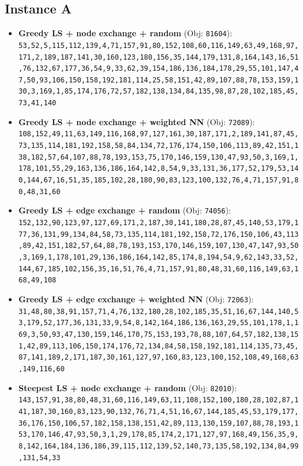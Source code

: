 \subsection{Instance A}
\begin{itemize}[leftmargin=1.5em]
    \item \textbf{Greedy LS + node exchange + random} (Obj: \texttt{81604}):\\
    \texttt{53,52,5,115,112,139,4,71,157,91,80,152,108,60,116,149,63,49,168,97,171,2,189,187,141,30,160,123,180,156,35,144,179,131,8,164,143,16,51,76,132,67,177,36,54,9,33,62,39,154,186,136,184,178,29,55,101,147,47,50,93,106,150,158,192,181,114,25,58,151,42,89,107,88,78,153,159,130,3,169,1,85,174,176,72,57,182,138,134,84,135,98,87,28,102,185,45,73,41,140}
    \item \textbf{Greedy LS + node exchange + weighted NN} (Obj: \texttt{72089}):\\
    \texttt{108,152,49,11,63,149,116,168,97,127,161,30,187,171,2,189,141,87,45,73,135,114,181,192,158,58,84,134,72,176,174,150,106,113,89,42,151,138,182,57,64,107,88,78,193,153,75,170,146,159,130,47,93,50,3,169,1,178,101,55,29,163,136,186,164,142,8,54,9,33,131,36,177,52,179,53,140,144,67,16,51,35,185,102,28,180,90,83,123,100,132,76,4,71,157,91,80,48,31,60}
    \item \textbf{Greedy LS + edge exchange + random} (Obj: \texttt{74056}):\\
    \texttt{152,132,90,123,97,127,69,171,2,187,30,141,180,28,87,45,140,53,179,177,36,131,99,134,84,58,73,135,114,181,192,158,72,176,150,106,43,113,89,42,151,182,57,64,88,78,193,153,170,146,159,107,130,47,147,93,50,3,169,1,178,101,29,136,186,164,142,85,174,8,194,54,9,62,143,33,52,144,67,185,102,156,35,16,51,76,4,71,157,91,80,48,31,60,116,149,63,168,49,108}
    \item \textbf{Greedy LS + edge exchange + weighted NN} (Obj: \texttt{72063}):\\
    \texttt{31,48,80,38,91,157,71,4,76,132,180,28,102,185,35,51,16,67,144,140,53,179,52,177,36,131,33,9,54,8,142,164,186,136,163,29,55,101,178,1,169,3,50,93,47,130,159,146,170,75,153,193,78,88,107,64,57,182,138,151,42,89,113,106,150,174,176,72,134,84,58,158,192,181,114,135,73,45,87,141,189,2,171,187,30,161,127,97,160,83,123,100,152,108,49,168,63,149,116,60}
    \item \textbf{Steepest LS + node exchange + random} (Obj: \texttt{82010}):\\
    \texttt{143,157,91,38,80,48,31,60,116,149,63,11,108,152,100,180,28,102,87,141,187,30,160,83,123,90,132,76,71,4,51,16,67,144,185,45,53,179,177,36,176,150,106,57,182,158,138,151,42,89,113,130,159,107,88,78,193,153,170,146,47,93,50,3,1,29,178,85,174,2,171,127,97,168,49,156,35,9,8,142,164,184,136,186,39,115,112,139,52,140,73,135,58,192,134,84,99,131,54,33}

\end{itemize}

